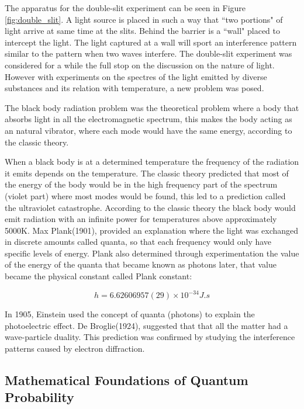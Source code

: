 The apparatus for the double-slit experiment can be seen in Figure \ref{fig:double_slit}. A light source is placed in such a way that ``two portions" of light arrive at same time at the slits. Behind the barrier is a ``wall" placed to intercept the light. 
The light captured at a wall will sport an interference pattern similar to the pattern when two  waves interfere.
The double-slit experiment was considered for a while the full stop on the discussion on the nature of light.
However with experiments on the spectres of the light emitted by diverse substances and its relation with temperature, a new problem was posed. 


The black body radiation problem was the theoretical problem where a body that absorbs light in all the electromagnetic spectrum, this makes the body acting as an natural vibrator, where each mode would have the same energy, according to the classic theory. 

When a black body is at a determined temperature the frequency of the radiation it emits depends on the temperature. The classic theory predicted that most of the energy of the body would be in the high frequency part of the spectrum (violet part) where most modes would be found, this led to a prediction called the ultraviolet catastrophe. According to the classic theory the black body would emit radiation with an infinite power for temperatures above approximately 5000K. 
Max Plank(1901), provided an explanation where the light was exchanged in discrete amounts called quanta, so that each frequency would only have specific levels of energy. Plank also determined through experimentation the value of the energy of the quanta that became known as photons later, that value became the physical constant called Plank constant:

\begin{equation}
\label{eq:plankconstant}
h = 6.62606957(29) \times 10^{-34} J.s
\end{equation}

In 1905, Einstein used the concept of quanta (photons) to explain the photoelectric effect. 
De Broglie(1924), suggested that that all the matter had a wave-particle duality. This prediction was confirmed by studying the interference patterns caused by electron diffraction.


\subsection{Mathematical Foundations of Quantum Probability} 

